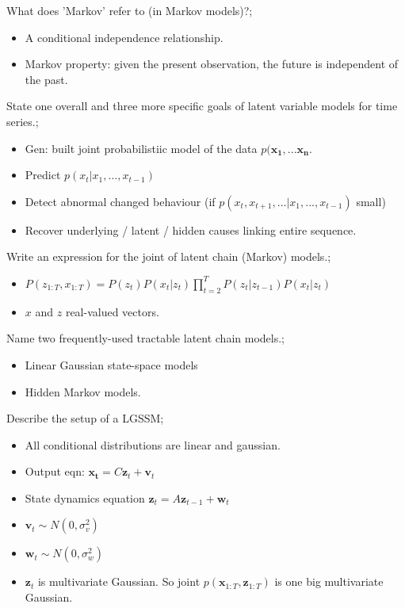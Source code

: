\documentclass{article}
\begin{document}
What does 'Markov' refer to (in Markov models)?; \begin{itemize}
    \item A conditional independence relationship. 
    \item Markov property: given the present observation, the future is independent of the past.
\end{itemize}

State one overall and three more specific goals of latent variable models for time series.; \begin{itemize}
    \item Gen: built joint probabilistiic model of the data $p(\mathbf{x_1,...x_n}$.
    \item Predict $p(x_t|x_1,...,x_{t-1})$
    \item Detect abnormal changed behaviour (if $p(x_t, x_{t+1}, ...|x_1,...,x_{t-1})$ small)
    \item Recover underlying / latent / hidden causes linking entire sequence.
\end{itemize}

Write an expression for the joint of latent chain (Markov) models.; \begin{itemize}
    \item $P(z_{1:T}, x_{1:T}) = P(z_t)P(x_t|z_t)\prod_{t=2}^TP(z_t|z_{t-1})P(x_t|z_t)$
    \item $x$ and $z$ real-valued vectors.
\end{itemize}

Name two frequently-used tractable latent chain models.; \begin{itemize}
    \item Linear Gaussian state-space models
    \item Hidden Markov models.
\end{itemize}

Describe the setup of a LGSSM; \begin{itemize}
    \item All conditional distributions are linear and gaussian.
    \item Output eqn: $\mathbf{x_t}=C\mathbf{z}_t+\mathbf{v}_t$
    \item State dynamics equation $\mathbf{z}_t=A\mathbf{z}_{t-1}+\mathbf{w}_t$
    \item $\mathbf{v}_t \sim N(0,\sigma^2_v)$
    \item $\mathbf{w}_t \sim N(0,\sigma^2_w)$
    \item $\mathbf{z}_t$ is multivariate Gaussian. So joint $p(\mathbf{x}_{1:T}, \mathbf{z}_{1:T})$ is one big multivariate Gaussian.
\end{itemize}
\end{document}

